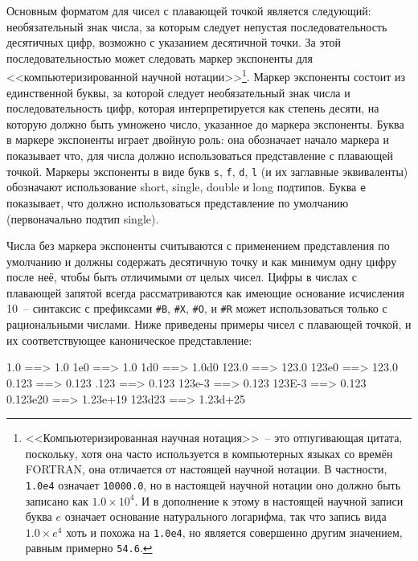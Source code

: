 Основным форматом для чисел с плавающей точкой является следующий: необязательный знак
числа, за которым следует непустая последовательность десятичных цифр, возможно с
указанием десятичной точки.  За этой последовательностью может следовать маркер экспоненты
для <<компьютеризированной научной нотации>>\footnote{<<Компьютеризированная научная
  нотация>>~-- это отпугивающая цитата, поскольку, хотя она часто используется в
  компьютерных языках со времён FORTRAN, она отличается от настоящей научной нотации.  В
  частности, \lstinline{1.0e4} означает \lstinline{10000.0}, но в настоящей научной нотации оно
  должно быть записано как $1.0 \times 10^4$.  И в дополнение к этому в настоящей научной
  записи буква $e$ означает основание натурального логарифма, так что запись вида
  $1.0 \times e^4$ хоть и похожа на \lstinline{1.0e4}, но является совершенно другим
  значением, равным примерно \lstinline{54.6}.}\hspace{\footnotenegspace}.  Маркер экспоненты состоит из единственной
буквы, за которой следует необязательный знак числа и последовательность цифр, которая
интерпретируется как степень десяти, на которую должно быть умножено число, указанное до
маркера экспоненты.  Буква в маркере экспоненты играет двойную роль: она обозначает начало
маркера и показывает что, для числа должно использоваться представление с плавающей
точкой.  Маркеры экспоненты в виде букв \lstinline{s}, \lstinline{f}, \lstinline{d}, \lstinline{l} (и их
заглавные эквиваленты) обозначают использование short, single, double и long подтипов.
Буква \lstinline{e} показывает, что должно использоваться представление по умолчанию
(первоначально подтип single).

Числа без маркера экспоненты считываются с применением представления по умолчанию и
должны содержать десятичную точку и как минимум одну цифру пос\-ле неё, чтобы быть отличимыми
от целых чисел.  Цифры в числах с плавающей запятой всегда рассматриваются как имеющие
основание исчисления 10~-- синтаксис с префиксами \lstinline{#B}, \lstinline{#X}, \lstinline{#O}, и
\lstinline{#R} может использоваться только с рациональными числами.  Ниже приведены примеры
чисел с плавающей точкой, и их соответствующее каноническое представление:

\begin{myverb}
1.0      ==> 1.0
1e0      ==> 1.0
1d0      ==> 1.0d0
123.0    ==> 123.0
123e0    ==> 123.0
0.123    ==> 0.123
.123     ==> 0.123
123e-3   ==> 0.123
123E-3   ==> 0.123
0.123e20 ==> 1.23e+19
123d23   ==> 1.23d+25
\end{myverb}

